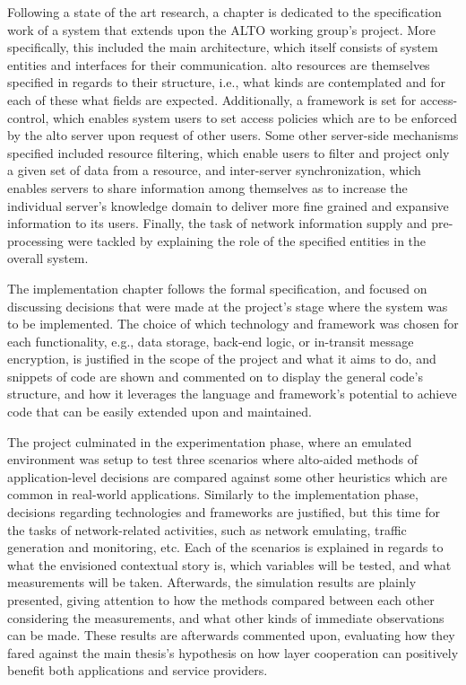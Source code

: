     Following a state of the art research, a chapter is dedicated to the specification work of a system that extends upon the ALTO working group's project.
    More specifically, this included the main architecture, which itself consists of system entities and interfaces for their communication. \gls{alto} resources are themselves specified in regards to their structure, i.e., what kinds are contemplated and for each of these what fields are expected. 
    Additionally, a framework is set for access-control, which enables system
    users to set access policies which are to be enforced by the \gls{alto} server upon request of other users.
    Some other server-side mechanisms specified included resource filtering, which enable users to filter and project only a given set of data from a resource,
and inter-server synchronization, which enables servers to share information among themselves as to increase the individual server's knowledge domain to deliver more fine grained and expansive information to its users.
    Finally, the task of network information supply and pre-processing were tackled by explaining the role of the specified entities in the overall system.

    The implementation chapter follows the formal specification, and focused on discussing decisions that were made at the project's stage where the system was to be implemented. 
    The choice of which technology and framework was chosen for each functionality, e.g., data storage, back-end logic, or in-transit message encryption, is justified in the scope of the project and what it aims to do, and snippets of code are shown and commented on to display the general code's structure, and how it leverages the language and framework's potential to achieve code that can be easily extended upon and maintained.
    
    The project culminated in the experimentation phase, where an emulated environment was setup to test three scenarios where \gls{alto}-aided methods of application-level decisions are compared against some other heuristics which are common in real-world applications.
    Similarly to the implementation phase, decisions regarding technologies and frameworks are justified, but this time for the tasks of network-related activities, such as network emulating, traffic generation and monitoring, etc. 
    Each of the scenarios is explained in regards to what the envisioned contextual story is, which variables will be tested, and what measurements will be taken. 
    Afterwards, the simulation results are plainly presented, giving attention to how the methods compared between each other considering the measurements, and what other kinds of immediate observations can be made. 
    These results are afterwards commented upon, evaluating how they fared against the main thesis's hypothesis on how layer cooperation can positively benefit both applications and service providers.

